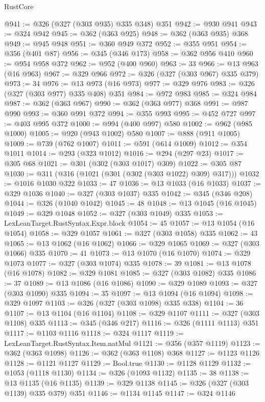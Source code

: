 \begin{lexlean}{RustCore}
\begin{coremodule}
@941 := @326 (@327 (@303 @935) @335 @348) @351
@942 := @930 @941
@943 := @324 @942
@945 := @362 (@363 @925)
@948 := @362 (@363 @935) @368
@949 := @945 @948
@951 := @360 @949 @372
@952 := @355 @951
@954 := @356 (@401 @87)
@956 := @345 (@346 @173)
@958 := @362 @956 @410
@960 := @954 @958 @372
@962 := @952 (@400 @960)
@963 := 33
@966 := @13 @963 (@16 @963)
@967 := @329 @966
@972 := @326 (@327 (@303 @967) @335 @379)
@973 := 34
@976 := @13 @973 (@16 @973)
@977 := @329 @976
@983 := @326 (@327 (@303 @977) @335 @408) @351
@984 := @972 @983
@985 := @324 @984
@987 := @362 (@363 @967)
@990 := @362 (@363 @977) @368
@991 := @987 @990
@993 := @360 @991 @372
@994 := @355 @993
@995 := @452 @727
@997 := @403 @995 @372
@1000 := @994 (@400 @997) @580
@1002 := @962 (@985 @1000)
@1005 := @920 (@943 @1002) @580
@1007 := @888 (@911 @1005)
@1009 := @739 (@762 @1007)
@1011 := @591 (@614 @1009)
@1012 := @354 @1011
@1014 := @293 (@323 @1012)
@1016 := @294 (@297 @23)
@1017 := @305 @68
@1021 := @301 (@302 (@303 @1017) @309)
@1022 := @305 @87
@1030 := @311 (@316 (@1021 (@301 (@302 (@303 @1022) @309) @317)))
@1032 := @1016 @1030 @322
@1033 := 47
@1036 := @13 @1033 (@16 @1033)
@1037 := @329 @1036
@1040 := @327 (@303 @1037) @335
@1042 := @345 (@346 @208)
@1044 := @326 (@1040 @1042)
@1045 := 48
@1048 := @13 @1045 (@16 @1045)
@1049 := @329 @1048
@1052 := @327 (@303 @1049) @335
@1053 := LexLeanTarget.RustSyntax.Expr.block
@1054 := 45
@1057 := @13 @1054 (@16 @1054)
@1058 := @329 @1057
@1061 := @327 (@303 @1058) @335
@1062 := 43
@1065 := @13 @1062 (@16 @1062)
@1066 := @329 @1065
@1069 := @327 (@303 @1066) @335
@1070 := 41
@1073 := @13 @1070 (@16 @1070)
@1074 := @329 @1073
@1077 := @327 (@303 @1074) @335
@1078 := 39
@1081 := @13 @1078 (@16 @1078)
@1082 := @329 @1081
@1085 := @327 (@303 @1082) @335
@1086 := 37
@1089 := @13 @1086 (@16 @1086)
@1090 := @329 @1089
@1093 := @327 (@303 @1090) @335
@1094 := 35
@1097 := @13 @1094 (@16 @1094)
@1098 := @329 @1097
@1103 := @326 (@327 (@303 @1098) @335 @338)
@1104 := 36
@1107 := @13 @1104 (@16 @1104)
@1108 := @329 @1107
@1111 := @327 (@303 @1108) @335
@1113 := @345 (@346 @217)
@1116 := @326 (@1111 @1113) @351
@1117 := @1103 @1116
@1118 := @324 @1117
@1119 := LexLeanTarget.RustSyntax.Item.natMul
@1121 := @356 (@357 @1119)
@1123 := @362 (@363 @1098)
@1126 := @362 (@363 @1108) @368
@1127 := @1123 @1126
@1128 := @1121 @1127
@1129 := Bool.true
@1130 := @1128 @1129
@1132 := @1053 (@1118 @1130)
@1134 := @326 (@1093 @1132)
@1135 := 38
@1138 := @13 @1135 (@16 @1135)
@1139 := @329 @1138
@1145 := @326 (@327 (@303 @1139) @335 @379) @351
@1146 := @1134 @1145
@1147 := @324 @1146

\end{coremodule}
\end{lexlean}
